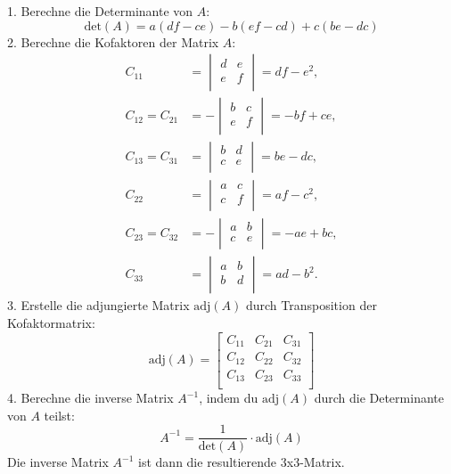 \documentclass[12pt]{article}
\begin{document}
1. Berechne die Determinante von $A$:
\[
\text{det}(A) = a(df - ce) - b(ef - cd) + c(be - dc)
\]
2. Berechne die Kofaktoren der Matrix $A$:
\[
\begin{aligned}
C_{11} &= \begin{vmatrix}
    d & e \\
    e & f \\
\end{vmatrix} = df - e^2, \\
C_{12} = C_{21} &= -\begin{vmatrix}
    b & c \\
    e & f \\
\end{vmatrix} = -bf + ce, \\
C_{13} = C_{31} &= \begin{vmatrix}
    b & d \\
    c & e \\
\end{vmatrix} = be - dc, \\
C_{22} &= \begin{vmatrix}
    a & c \\
    c & f \\
\end{vmatrix} = af - c^2, \\
C_{23} = C_{32} &= -\begin{vmatrix}
    a & b \\
    c & e \\
\end{vmatrix} = -ae + bc, \\
C_{33} &= \begin{vmatrix}
    a & b \\
    b & d \\
\end{vmatrix} = ad - b^2.
\end{aligned}
\]
3. Erstelle die adjungierte Matrix $\text{adj}(A)$ durch Transposition der Kofaktormatrix:
\[
\text{adj}(A) = \begin{bmatrix}
    C_{11} & C_{21} & C_{31} \\
    C_{12} & C_{22} & C_{32} \\
    C_{13} & C_{23} & C_{33} \\
\end{bmatrix}
\]
4. Berechne die inverse Matrix $A^{-1}$, indem du $\text{adj}(A)$ durch die Determinante von $A$ teilst:
\[
A^{-1} = \frac{1}{\text{det}(A)} \cdot \text{adj}(A)
\]
Die inverse Matrix $A^{-1}$ ist dann die resultierende 3x3-Matrix.\\
\end{document}
